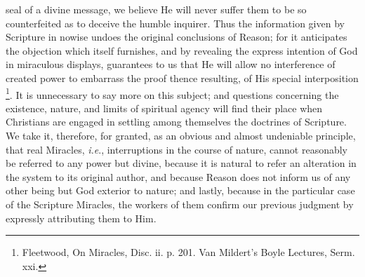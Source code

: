 seal of a divine message, we believe He will never suffer them to be
so counterfeited as to deceive the humble inquirer. Thus the
information given by Scripture in nowise undoes the original
conclusions of Reason; for it anticipates the objection which itself
furnishes, and by revealing the express intention of God in miraculous
displays, guarantees to us that He will allow no interference of
created power to embarrass the proof thence resulting, of His special
interposition \footnote{Fleetwood, On Miracles, Disc. ii. p. 201. Van Mildert's Boyle
Lectures, Serm. xxi.}. It is
unnecessary to say more on this subject; and questions concerning the
existence, nature, and limits of spiritual agency will find their
place when Christians are engaged in settling among themselves the
doctrines of Scripture. We take it, therefore, for granted, as an
obvious and almost undeniable principle, that real Miracles, \emph{i.e}.,
interruptions in the course of nature, cannot reasonably be referred
to any power but divine, because it is natural to refer an alteration
in the system to its original author, and because Reason does not
inform us of any other being but God exterior to nature; and lastly,
because in the particular case of the Scripture Miracles, the workers
of them confirm our previous judgment by expressly attributing them to
Him.

